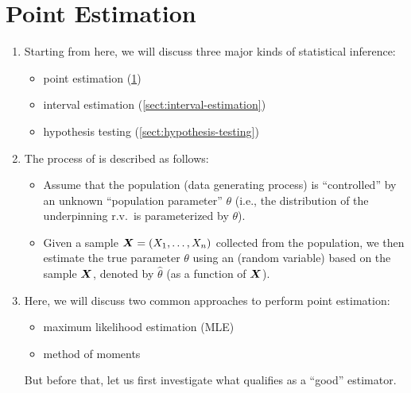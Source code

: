 \section{Point Estimation}
\label{sect:point-estimation}
\begin{enumerate}
\item Starting from here, we will discuss three major kinds of statistical
inference:
\begin{itemize}
\item point estimation (\cref{sect:point-estimation})
\item interval estimation (\cref{sect:interval-estimation})
\item hypothesis testing (\cref{sect:hypothesis-testing})
\end{itemize}
\item The process of  is described as follows:
\begin{itemize}
\item Assume that the population (data generating process) is ``controlled'' by
an unknown ``population parameter'' \(\theta\) (i.e., the distribution of the
underpinning r.v.\ is parameterized by \(\theta\)).
\item Given a sample \(\vb*{X}=(X_1,\dotsc,X_n)\) collected from the
population, we then estimate the true parameter \(\theta\) using an 
(random variable) based on the sample \(\vb*{X}\), denoted by \(\widehat{\theta}\)
(as a function of \(\vb*{X}\)).

\end{itemize}
\item Here, we will discuss two common approaches to perform point estimation:
\begin{itemize}
\item maximum likelihood estimation (MLE)
\item method of moments
\end{itemize}
But before that, let us first investigate what qualifies as a ``good''
estimator.


\end{enumerate}
